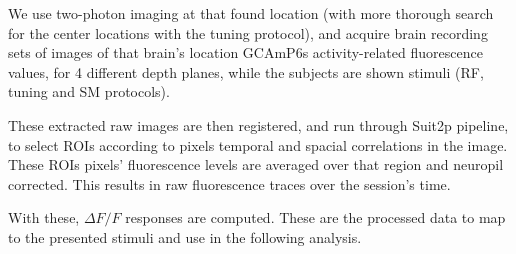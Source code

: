 We use two-photon imaging at that found location (with more thorough search for the center locations with the tuning protocol), and acquire brain recording sets of images of that brain's location GCAmP6s activity-related fluorescence values, for 4 different depth planes, while the subjects are shown stimuli (RF, tuning and SM protocols). 

These extracted raw images are then registered, and run through Suit2p pipeline, to select ROIs according to pixels temporal and spacial correlations in the image. These ROIs pixels' fluorescence levels are averaged over that region and neuropil corrected. This results in raw fluorescence traces over the session's time.

With these, $\Delta F/F$ responses are computed. These are the processed data to map to the presented stimuli and use in the following analysis.

%
%
